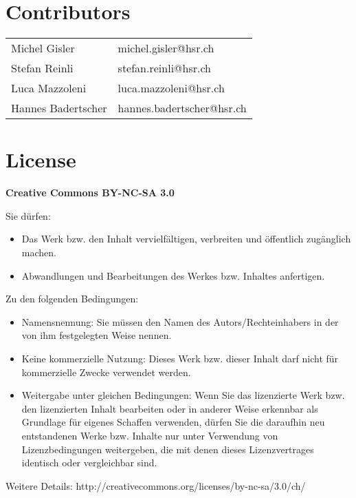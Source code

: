 \section*{Contributors}
\begin{tabular}{ll}
    Michel Gisler & michel.gisler@hsr.ch \\
    Stefan Reinli & stefan.reinli@hsr.ch \\ 
    Luca Mazzoleni& luca.mazzoleni@hsr.ch \\ 
    Hannes Badertscher& hannes.badertscher@hsr.ch \\    
\end{tabular} 

{\scriptsize 
    \section*{License}
    \textbf{Creative Commons BY-NC-SA 3.0}
    
    Sie dürfen:
    \begin{itemize}
        \item Das Werk bzw. den Inhalt vervielfältigen, verbreiten und öffentlich
        zugänglich machen.
        \item Abwandlungen und Bearbeitungen des Werkes bzw. Inhaltes anfertigen.
    \end{itemize}
    Zu den folgenden Bedingungen:
    \begin{itemize}
        \item Namensnennung: Sie müssen den Namen des Autors/Rechteinhabers in der von ihm
        festgelegten Weise nennen.
        \item Keine kommerzielle Nutzung: Dieses Werk bzw. dieser Inhalt darf nicht für
        kommerzielle Zwecke verwendet werden.
        \item  Weitergabe unter gleichen Bedingungen: Wenn Sie das lizenzierte Werk bzw. den
        lizenzierten Inhalt bearbeiten oder in anderer Weise erkennbar als Grundlage
        für eigenes Schaffen verwenden, dürfen Sie die daraufhin neu entstandenen
        Werke bzw. Inhalte nur unter Verwendung von Lizenzbedingungen weitergeben,
        die mit denen dieses Lizenzvertrages identisch oder vergleichbar sind.
    \end{itemize}
    Weitere Details: http://creativecommons.org/licenses/by-nc-sa/3.0/ch/
}
\clearpage
{}%